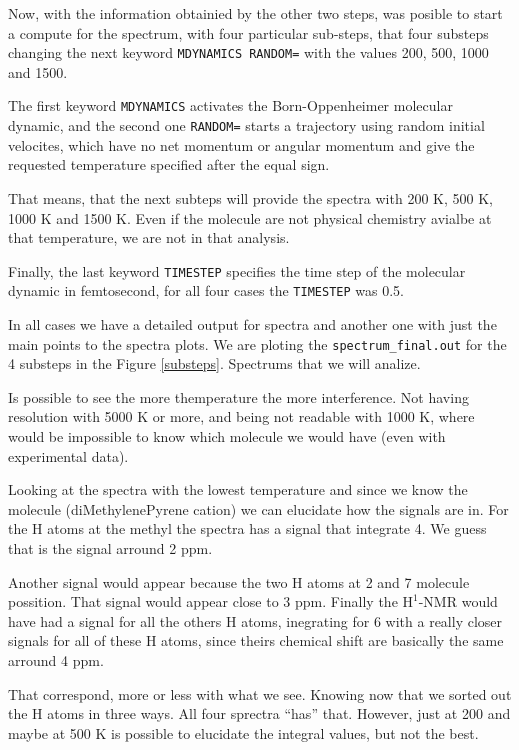 Now, with the information obtainied by the other two steps, was posible to start
a compute for the spectrum, with four particular sub-steps, that four substeps changing the
next keyword \texttt{MDYNAMICS RANDOM=} with the values 200, 500, 1000 and
1500.

The first keyword \texttt{MDYNAMICS} activates the Born-Oppenheimer molecular
dynamic, and the second one \texttt{RANDOM=} starts a trajectory using random
initial velocites, which have no net momentum or angular momentum and give the
requested temperature specified after the equal sign.

That means, that the next subteps will provide the spectra with
200 K, 500 K, 1000 K and 1500 K.
Even if the molecule are not physical chemistry avialbe at that temperature, we
are not in that analysis.

Finally, the last keyword \texttt{TIMESTEP} specifies the time step of the molecular dynamic
in femtosecond, for all four cases the \texttt{TIMESTEP} was 0.5.

In all cases we have a detailed output for spectra and another one with just
the main points to the spectra plots. We are ploting the
\texttt{spectrum\_final.out} for the 4 substeps in the Figure \ref{substeps}.
Spectrums that we will analize.

Is possible to see the more themperature the more interference. Not having resolution
with 5000 K or more, and being not readable with 1000 K, where would be impossible to
know which molecule we would have (even with experimental data).

Looking at the spectra with the lowest temperature and since we know the
molecule (diMethylenePyrene cation) we can elucidate how the signals are in. 
For the H atoms at the methyl the spectra has a signal that integrate 4. We guess that is
the signal arround 2 ppm.

Another signal would appear because the two H atoms at 2
and 7 molecule possition. That signal would appear close to 3 ppm. Finally the
$\mathrm{H^1}$-NMR would have had a signal for all the others H atoms,
inegrating for 6 with a really closer signals for all of these H atoms, since
theirs chemical shift are basically the same arround 4 ppm.

That correspond, more or less with what we see. Knowing now that we sorted out the H
atoms in three ways. All four sprectra ``has'' that. However, just at 200
and maybe at 500 K is possible to elucidate the integral values, but not
the best.

